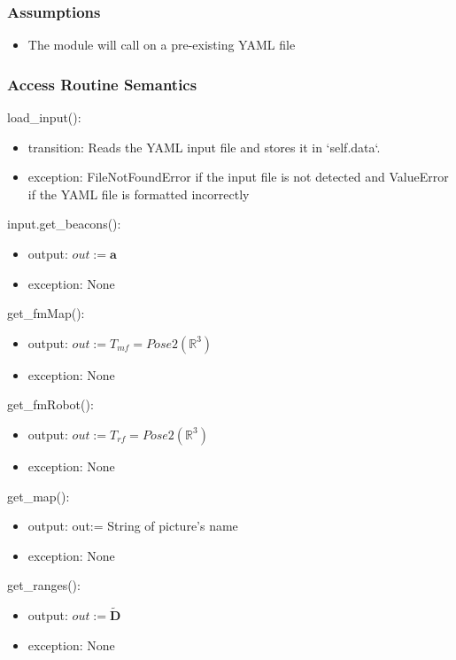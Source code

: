 \documentclass[12pt, titlepage]{article}
\begin{document}
\subsubsection{Assumptions}
\begin{itemize}
  \item The module will call on a pre-existing YAML file
\end{itemize}

\subsubsection{Access Routine Semantics}

\noindent load\_input():
\begin{itemize}
  \item transition: Reads the YAML input file and stores it in `self.data`.
    \item exception: FileNotFoundError if the input file is not detected and ValueError if the YAML file is formatted incorrectly
\end{itemize}

\noindent input.get\_beacons():
\begin{itemize}
    \item output: $out:=\mathbf{a}$
    \item exception: None
\end{itemize}

\noindent get\_fmMap():
\begin{itemize}
    \item output: $out:= T_{mf}=Pose2(\mathbb{R}^{3})$
    \item exception: None
\end{itemize}

\noindent get\_fmRobot():
\begin{itemize}
    \item output: $out:= T_{rf}=Pose2(\mathbb{R}^{3})$
    \item exception: None
\end{itemize}

\noindent get\_map():
\begin{itemize}
    \item output: out:=  String of picture's name  
    \item exception: None
\end{itemize}

\noindent get\_ranges():
\begin{itemize}
    \item output: $out:=\mathbf{\tilde{D}}$
    \item exception: None
\end{itemize}
\end{document}
